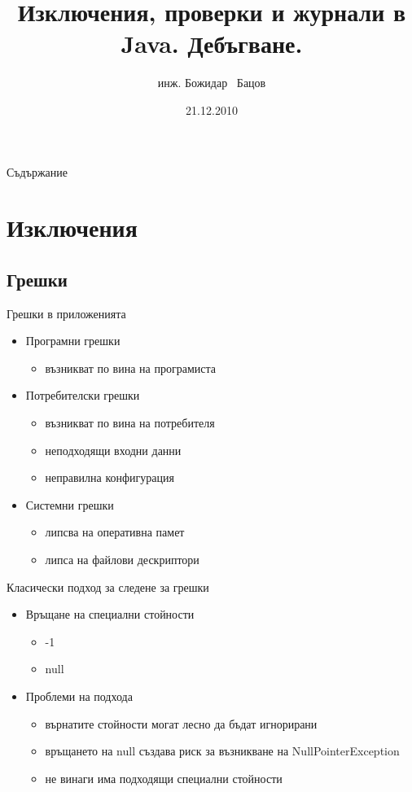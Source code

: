 \documentclass{beamer}
\title{Изключения, проверки и журнали в Java. Дебъгване.}
\author{инж. Божидар ~Бацов}
\institute{Drow Ltd.}
\date{21.12.2010}
\begin{document}
\begin{frame}
  \titlepage
\end{frame}

\begin{frame}{Съдържание}
  \tableofcontents[pausesections]
\end{frame}

\section{Изключения}

\subsection{Грешки}

\begin{frame}{Грешки в приложенията}
  \begin{itemize}
  \item Програмни грешки
    \begin{itemize}
      \item възникват по вина на програмиста
    \end{itemize}
  \item Потребителски грешки
      \begin{itemize}
        \item възникват по вина на потребителя
        \item неподходящи входни данни
        \item неправилна конфигурация
      \end{itemize}
  \item Системни грешки
  \begin{itemize}
    \item липсва на оперативна памет
    \item липса на файлови дескриптори
  \end{itemize}

  \end{itemize}
\end{frame}

\begin{frame}{Класически подход за следене за грешки}
  \transdissolve
  \begin{itemize}
  \item Връщане на специални стойности
    \begin{itemize}
      \item -1
      \item null
    \end{itemize}
  \item Проблеми на подхода
    \begin{itemize}
      \item върнатите стойности могат лесно да бъдат игнорирани
      \item връщането на null създава риск за възникване на
        NullPointerException
      \item не винаги има подходящи специални стойности
    \end{itemize}

  \end{itemize}
\end{frame}
\end{document}
